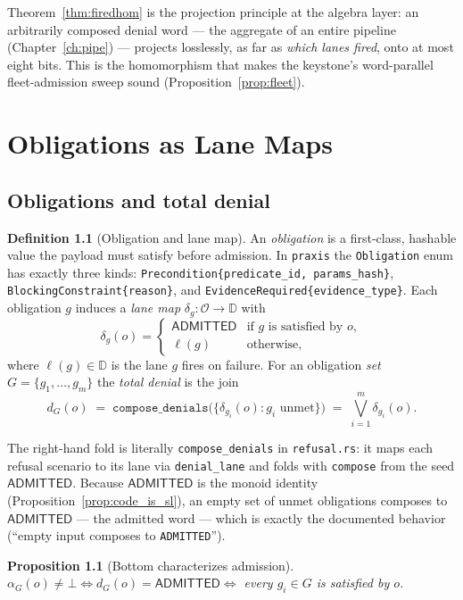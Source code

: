 \documentclass[11pt,oneside]{book}
\theoremstyle{definition}
\newtheorem{definition}{Definition}[chapter]
\theoremstyle{plain}
\newtheorem{proposition}[theorem]{Proposition}
\theoremstyle{remark}
\newcommand{\Obs}{\mathcal{O}}                 %
\newcommand{\adm}{\alpha}                      %
\newcommand{\Rfsl}{\bot}                        %
\newcommand{\code}[1]{\texttt{#1}}
\newcommand{\Deny}{\mathbb{D}}                 %
\newcommand{\Adml}{\mathsf{ADMITTED}}          %
\begin{document}
Theorem~\ref{thm:firedhom} is the projection principle at the algebra layer: an arbitrarily
composed denial word --- the aggregate of an entire pipeline (Chapter~\ref{ch:pipe}) ---
projects losslessly, as far as \emph{which lanes fired}, onto at most eight bits. This is the
homomorphism that makes the keystone's word-parallel fleet-admission sweep sound
(Proposition~\ref{prop:fleet}).

\chapter{Obligations as Lane Maps}
\label{ch:ob}

\section{Obligations and total denial}

\begin{definition}[Obligation and lane map]\label{def:ob}
An \emph{obligation} is a first-class, hashable value the payload must satisfy before
admission. In \code{praxis} the \code{Obligation} enum has exactly three kinds:
\code{Precondition\{predicate\_id, params\_hash\}}, \code{BlockingConstraint\{reason\}}, and
\code{EvidenceRequired\{evidence\_type\}}. Each obligation $g$ induces a \emph{lane map}
$\delta_g:\Obs\to\Deny$ with
\[
\delta_g(o)=\begin{cases}\Adml & \text{if }g\text{ is satisfied by }o,\\[2pt]
\ell(g) & \text{otherwise,}\end{cases}
\]
where $\ell(g)\in\Deny$ is the lane $g$ fires on failure. For an obligation \emph{set}
$G=\{g_1,\dots,g_m\}$ the \emph{total denial} is the join
\[
d_G(o)\;=\;\code{compose\_denials}\bigl(\{\delta_{g_i}(o):g_i\text{ unmet}\}\bigr)
\;=\;\bigvee_{i=1}^{m}\delta_{g_i}(o).
\]
\end{definition}

The right-hand fold is literally \code{compose\_denials} in \code{refusal.rs}: it maps each
refusal scenario to its lane via \code{denial\_lane} and folds with \code{compose} from the
seed $\Adml$. Because $\Adml$ is the monoid identity (Proposition~\ref{prop:code_is_sl}), an
empty set of unmet obligations composes to $\Adml$ --- the admitted word --- which is exactly
the documented behavior (``empty input composes to \code{ADMITTED}'').

\begin{proposition}[Bottom characterizes admission]\label{prop:bottom}
$\adm_G(o)\ne\Rfsl\iff d_G(o)=\Adml\iff$ every $g_i\in G$ is satisfied by $o$.
\end{proposition}
\end{document}
